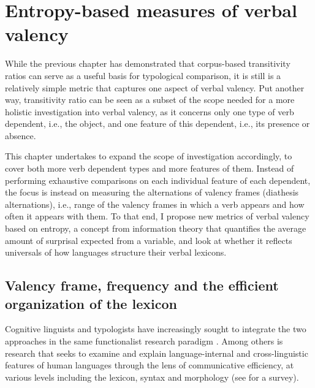\chapter{Entropy-based measures of verbal valency}\label{chapter:entropy}

While the previous chapter has demonstrated that corpus-based transitivity ratios can serve as a useful basis for typological comparison, it is still is a relatively simple metric that captures one aspect of verbal valency. Put another way, transitivity ratio can be seen as a subset of the scope needed for a more holistic investigation into verbal valency, as it concerns only one type of verb dependent, i.e., the object, and one feature of this dependent, i.e., its presence or absence. 

This chapter undertakes to expand the scope of investigation accordingly, to cover both more verb dependent types and more features of them. Instead of performing exhaustive comparisons on each individual feature of each dependent, the focus is instead on measuring the alternations of valency frames (diathesis alternations), i.e., range of the valency frames in which a verb appears and how often it appears with them. To that end, I propose new metrics of verbal valency based on entropy, a concept from information theory that quantifies the average amount of surprisal expected from a variable, and look at whether it reflects universals of how languages structure their verbal lexicons.


\section{Valency frame, frequency and the efficient organization of the lexicon}

Cognitive linguists and typologists have increasingly sought to integrate the two approaches in the same functionalist research paradigm \citep{croft2016}. Among others is research that seeks to examine and explain language-internal and cross-linguistic features of human languages through the lens of communicative efficiency, at various levels including the lexicon, syntax and morphology (see \citealp{gibson2019} for a survey). 


